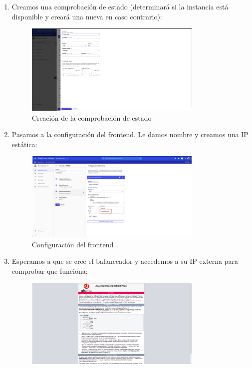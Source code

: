 \documentclass[12pt,spanish]{article}
\begin{document}
\begin{enumerate}
	\newpage
	\item Creamos una comprobación de estado (determinará si la instancia está disponible y creará una nueva en caso contrario):
	\begin{figure}[H]
		\centering
		\includegraphics[width=0.8\textwidth]{project/status_check.png}
		\caption{Creación de la comprobación de estado}
	\end{figure}
	\item Pasamos a la configuración del frontend. Le damos nombre y creamos una IP estática:
	\begin{figure}[H]
		\centering
		\includegraphics[width=0.8\textwidth]{project/frontend.png}
		\caption{Configuración del frontend}
	\end{figure}
	\newpage
	\item Esperamos a que se cree el balanceador y accedemos a su IP externa para comprobar que funciona:
	\begin{figure}[H]
		\centering
		\includegraphics[width=0.8\textwidth]{project/load_balancer_ok.png}

\end{figure}
\end{enumerate}
\end{document}
